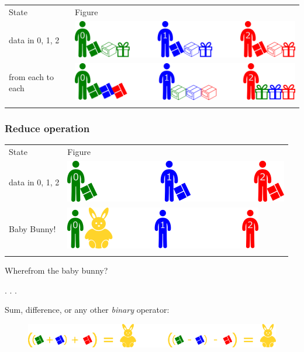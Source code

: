 \begin{longtable}[c]{@{}ll@{}}
\toprule\addlinespace
State & Figure
\\\addlinespace
\midrule\endhead
data in 0, 1, 2 & \includegraphics{06MPI/figures/all2all0.png}
\\\addlinespace
from each to each & \includegraphics{06MPI/figures/all2all1.png}
\\\addlinespace
\bottomrule
\end{longtable}

\subsubsection{Reduce operation}\label{reduce-operation}

\begin{longtable}[c]{@{}ll@{}}
\toprule\addlinespace
State & Figure
\\\addlinespace
\midrule\endhead
data in 0, 1, 2 & \includegraphics{06MPI/figures/collective.png}
\\\addlinespace
Baby Bunny! & \includegraphics{06MPI/figures/reduce1.png}
\\\addlinespace
\bottomrule
\end{longtable}

Wherefrom the baby bunny?

. . .

Sum, difference, or any other \emph{binary} operator:

\begin{figure}[htbp]
\centering
\includegraphics{06MPI/figures/BunnyOps.png}
\end{figure}

